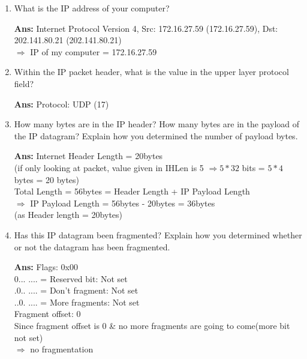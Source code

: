 \documentclass[a4,11pt]{article}
\newenvironment{que}
{ \color{YellowGreen}
  \begin{question}
}
{ \end{question} }
\newenvironment{sol}
{ \color{Black}
  \begin{solution}
}
{ \end{solution} }
\begin{document}
  \begin{enumerate}
   \item
    \begin{que}
      What is the IP address of your computer?
    \end{que}
    
    \begin{sol}
    \textbf{Ans:}  Internet Protocol Version 4, Src: 172.16.27.59 (172.16.27.59), Dst: 202.141.80.21 (202.141.80.21) \\
	$\Rightarrow$  IP of my computer = 172.16.27.59    
    \end{sol}

   
    \item
      \begin{que}
	Within the IP packet header, what is the value in the upper layer protocol field?
      \end{que}
      
      \begin{sol}
      \textbf{Ans:} 	Protocol: UDP (17)
      \end{sol}

      
    \item
      \begin{que}
	How many bytes are in the IP header? How many bytes are in the payload of the IP datagram? 
	Explain how you determined the number of payload bytes.
      \end{que}
      
      \begin{sol}
	 \textbf{Ans:} Internet Header Length = 20bytes \\
	(if only looking at packet, value given in IHLen is 5 $\Rightarrow 5*32$ bits = $5*4$bytes = 20 bytes) \\
	
	Total Length = 56bytes = Header Length + IP Payload Length \\
	$\Rightarrow$ IP Payload Length = 56bytes - 20bytes = 36bytes \\
	(as Header length = 20bytes)
      \end{sol}

     \item
      \begin{que}
	 Has this IP datagram been fragmented? Explain how you determined whether or not the datagram has been fragmented.
      \end{que}
      
      \begin{sol}
	 \textbf{Ans:}   Flags: 0x00 \\
	  0... .... = Reserved bit:   Not set \\
	  .0.. .... = Don't fragment: Not set \\
	  ..0. .... = More fragments: Not set \\
	  Fragment offset: 0 \\
	  Since fragment offset is 0 \& no more fragments are going to come(more bit not set) \\
	  $\Rightarrow$ no fragmentation
      \end{sol}


\end{enumerate}
\end{document}
